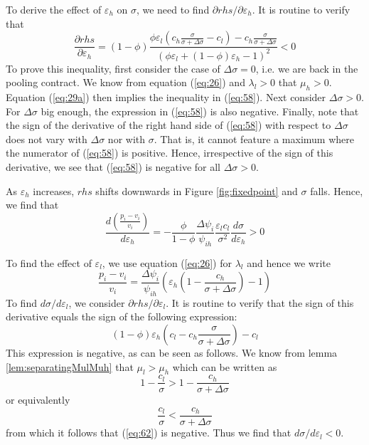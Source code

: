\documentclass[12pt,english,a4paper]{article}
\begin{document}
To derive the effect of \(\varepsilon_h\) on \(\sigma\), we need to find \(\partial rhs/\partial \varepsilon_h\). It is routine to verify that
\begin{equation}
\label{eq:58}
\frac{\partial rhs}{\partial \varepsilon_h} =
(1-\phi) \frac{\phi \varepsilon_l (c_h \frac{\sigma}{\sigma+\Delta\sigma}-c_l)-c_h \frac{\sigma}{\sigma+\Delta\sigma}}{(\phi \varepsilon_l + (1-\phi)\varepsilon_h -1)^2} < 0
\end{equation}
To prove this inequality, first consider the case of \(\Delta \sigma=0\), i.e. we are back in the pooling contract. We know from equation (\ref{eq:26}) and \(\lambda_l>0\) that \(\mu_h>0\). Equation (\ref{eq:29a}) then implies the inequality in (\ref{eq:58}). Next consider \(\Delta \sigma > 0\). For \(\Delta \sigma\) big enough, the expression in (\ref{eq:58}) is also negative. Finally, note that the sign of the derivative of the right hand side of (\ref{eq:58}) with respect to \(\Delta \sigma\) does not vary with \(\Delta \sigma\) nor with \(\sigma\). That is, it cannot feature a maximum where the numerator of (\ref{eq:58}) is positive. Hence, irrespective of the sign of this derivative, we see that (\ref{eq:58}) is negative for all \(\Delta \sigma > 0\).

As \(\varepsilon_h\) increases, \(rhs\) shifts downwards in Figure \ref{fig:fixedpoint} and \(\sigma\) falls. Hence, we find that
\begin{equation}
\label{eq:45}
\frac{d\left(\frac{p_i-v_i}{v_i} \right)}{d \varepsilon_h} = - \frac{\phi}{1-\phi} \frac{\Delta \psi_i}{\psi_{ih}} \frac{\varepsilon_l c_l}{\sigma^2} \frac{d\sigma}{d\varepsilon_h} > 0
\end{equation}

To find the effect of \(\varepsilon_l\), we use equation (\ref{eq:26}) for \(\lambda_l\) and hence we write
\begin{equation}
\label{eq:61}
\frac{p_i-v_i}{v_i} = \frac{\Delta\psi_i}{\psi_{ih}} \left(\varepsilon_h \left( 1-\frac{c_h}{\sigma+\Delta\sigma}\right)-1 \right)
\end{equation}
To find \(d\sigma/d\varepsilon_l\), we consider \(\partial rhs/\partial \varepsilon_l\). It is routine to verify that the sign of this derivative equals the sign of the following expression:
\begin{equation}
\label{eq:62}
(1-\phi) \varepsilon_h \left(c_l-c_h \frac{\sigma}{\sigma+\Delta\sigma} \right) - c_l
\end{equation}
This expression is negative, as can be seen as follows. We know from lemma \ref{lem:separatingMulMuh} that \(\mu_l>\mu_h\) which can be written as
\begin{equation}
\label{eq:70}
1-\frac{c_l}{\sigma} > 1-\frac{c_h}{\sigma+\Delta\sigma}
\end{equation}
or equivalently
\begin{equation}
\label{eq:71}
\frac{c_l}{\sigma} < \frac{c_h}{\sigma+\Delta\sigma}
\end{equation}
from which it follows that (\ref{eq:62}) is negative. Thus we find that \(d\sigma/d\varepsilon_l<0\).
\end{document}

